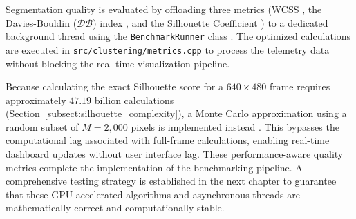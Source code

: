 Segmentation quality is evaluated by offloading three metrics (WCSS \cite{krzanowski1988criterion}, the Davies-Bouldin ($\mathcal{D}\mathcal{B}$) index \cite{davies1979cluster, xiao2017davies}, and the Silhouette Coefficient \cite{rousseeuw1987silhouettes, shutaywi2021silhouette}) to a dedicated background thread using the \texttt{BenchmarkRunner} class \cite{williams2019c++}. The optimized calculations are executed in \texttt{src/clustering/metrics.cpp} to process the telemetry data without blocking the real-time visualization pipeline.

Because calculating the exact Silhouette score for a $640 \times 480$ frame requires approximately $47.19$ billion calculations (Section~\ref{subsect:silhouette_complexity}), a Monte Carlo approximation using a random subset of $M=2,000$ pixels is implemented instead \cite{shutaywi2021silhouette}. This bypasses the computational lag associated with full-frame calculations, enabling real-time dashboard updates without user interface lag. These performance-aware quality metrics complete the implementation of the benchmarking pipeline. A comprehensive testing strategy is established in the next chapter to guarantee that these GPU-accelerated algorithms and asynchronous threads are mathematically correct and computationally stable.
